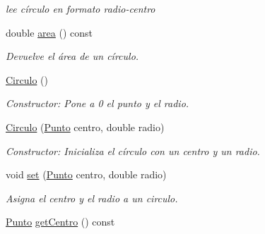 \begin{DoxyCompactItemize}
\begin{DoxyCompactList}\small\item\em lee círculo en formato radio-\/centro \end{DoxyCompactList}\item 
double \hyperlink{classCirculo_a532d4f2bd03b688403c4370319411dc3}{area} () const \hypertarget{classCirculo_a532d4f2bd03b688403c4370319411dc3}{}\label{classCirculo_a532d4f2bd03b688403c4370319411dc3}

\begin{DoxyCompactList}\small\item\em Devuelve el área de un círculo. \end{DoxyCompactList}\item 
\hyperlink{classCirculo_a6933bf908b78a4167684081a3a8f257f}{Circulo} ()\hypertarget{classCirculo_a6933bf908b78a4167684081a3a8f257f}{}\label{classCirculo_a6933bf908b78a4167684081a3a8f257f}

\begin{DoxyCompactList}\small\item\em Constructor\+: Pone a 0 el punto y el radio. \end{DoxyCompactList}\item 
\hyperlink{classCirculo_ad4c6c76f0227c25afcb872a8744ebe56}{Circulo} (\hyperlink{classPunto}{Punto} centro, double radio)\hypertarget{classCirculo_ad4c6c76f0227c25afcb872a8744ebe56}{}\label{classCirculo_ad4c6c76f0227c25afcb872a8744ebe56}

\begin{DoxyCompactList}\small\item\em Constructor\+: Inicializa el círculo con un centro y un radio. \end{DoxyCompactList}\item 
void \hyperlink{classCirculo_aa24cc4b316a3d9ece35f120d9b8e1fc4}{set} (\hyperlink{classPunto}{Punto} centro, double radio)\hypertarget{classCirculo_aa24cc4b316a3d9ece35f120d9b8e1fc4}{}\label{classCirculo_aa24cc4b316a3d9ece35f120d9b8e1fc4}

\begin{DoxyCompactList}\small\item\em Asigna el centro y el radio a un circulo. \end{DoxyCompactList}\item 
\hyperlink{classPunto}{Punto} \hyperlink{classCirculo_a022cde4d10d14a47a3b3921f80909f3b}{get\+Centro} () const \hypertarget{classCirculo_a022cde4d10d14a47a3b3921f80909f3b}{}\label{classCirculo_a022cde4d10d14a47a3b3921f80909f3b}


\end{DoxyCompactItemize}
